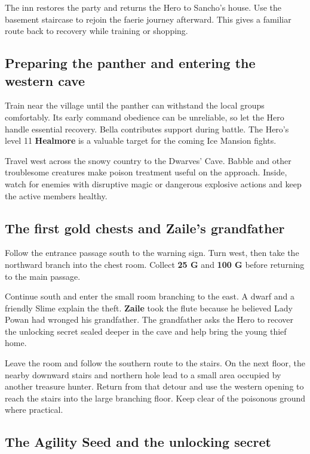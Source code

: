 The inn restores the party and returns the Hero to Sancho's house.
Use the basement staircase to rejoin the faerie journey afterward.
This gives a familiar route back to recovery while training or shopping.

\subsection*{Preparing the panther and entering the western cave}

Train near the village until the panther can withstand the local groups
comfortably. Its early command obedience can be unreliable, so let the
Hero handle essential recovery. Bella contributes support during battle.
The Hero's level 11 \textbf{Healmore} is a valuable target for the coming
Ice Mansion fights.

Travel west across the snowy country to the Dwarves' Cave. Babble and
other troublesome creatures make poison treatment useful on the approach.
Inside, watch for enemies with disruptive magic or dangerous explosive
actions and keep the active members healthy.

\subsection*{The first gold chests and Zaile's grandfather}

Follow the entrance passage south to the warning sign. Turn west, then
take the northward branch into the chest room. Collect \textbf{25 G}
and \textbf{100 G} before returning to the main passage.

Continue south and enter the small room branching to the east. A dwarf
and a friendly Slime explain the theft. \textbf{Zaile} took the flute
because he believed Lady Powan had wronged his grandfather. The grandfather
asks the Hero to recover the unlocking secret sealed deeper in the cave
and help bring the young thief home.

Leave the room and follow the southern route to the stairs. On the next
floor, the nearby downward stairs and northern hole lead to a small area
occupied by another treasure hunter. Return from that detour and use
the western opening to reach the stairs into the large branching floor.
Keep clear of the poisonous ground where practical.

\subsection*{The Agility Seed and the unlocking secret}

